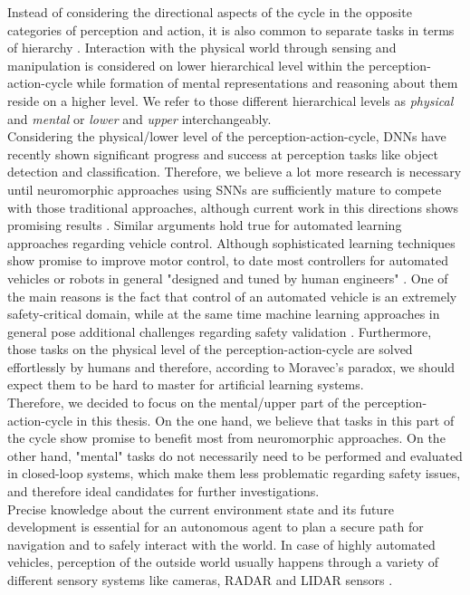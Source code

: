 Instead of considering the directional aspects of the cycle in the opposite categories of perception and action, it is also common to separate tasks in terms of hierarchy \cite{Loeb2014}.
Interaction with the physical world through sensing and manipulation is considered on lower hierarchical level within the perception-action-cycle while formation of mental representations and reasoning about them reside on a higher level. 
We refer to those different hierarchical levels as \emph{physical} and \emph{mental} or \emph{lower} and \emph{upper} interchangeably.\\
Considering the physical/lower level of the perception-action-cycle, \acp{DNN} have recently shown significant progress and success at perception tasks like object detection and classification.
Therefore, we believe a lot more research is necessary until neuromorphic approaches using \acp{SNN} are sufficiently mature to compete with those traditional approaches, although current work in this directions shows promising results \cite{Hunsberger2015}.
Similar arguments hold true for automated learning approaches regarding vehicle control.
Although sophisticated learning techniques show promise to improve motor control, to date most controllers for automated vehicles or robots in general "designed and tuned by human engineers" \cite{Deisenroth2013}.
One of the main reasons is the fact that control of an automated vehicle is an extremely safety-critical domain, while at the same time machine learning approaches in general pose additional challenges regarding safety validation \cite{Koopman2016}.
Furthermore, those tasks on the physical level of the perception-action-cycle are solved effortlessly by humans and therefore, according to Moravec's paradox, we should expect them to be hard to master for artificial learning systems.\\
Therefore, we decided to focus on the mental/upper part of the perception-action-cycle in this thesis.
On the one hand, we believe that tasks in this part of the cycle show promise to benefit most from neuromorphic approaches. 
On the other hand, "mental" tasks do not necessarily need to be performed and evaluated in closed-loop systems, which make them less problematic regarding safety issues, and therefore ideal candidates for further investigations.\\
Precise knowledge about the current environment state and its future development is essential for an autonomous agent to plan a secure path for navigation and to safely interact with the world. 
In case of highly automated vehicles, perception of the outside world usually happens through a variety of different sensory systems like cameras, \acs{RADAR} and \acs{LIDAR} sensors \cite{Aeberhard2015}. 
